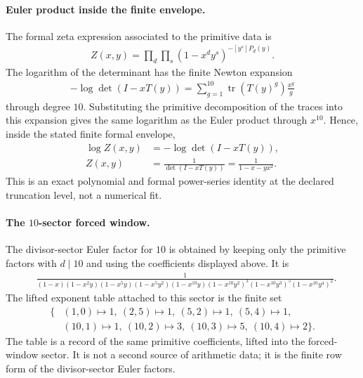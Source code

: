 \paragraph{Euler product inside the finite envelope.}
The formal zeta expression associated to the primitive data is
$$
\begin{aligned}
Z(x,y)=\prod_d\prod_s\left(1-x^d y^s\right)^{-[y^s]P_d(y)}.
\end{aligned}
$$
The logarithm of the determinant has the finite Newton expansion
$$
\begin{aligned}
-\log\det(I-xT(y))=\sum_{g=1}^{10}\operatorname{tr}(T(y)^g)\frac{x^g}{g}
\end{aligned}
$$
through degree $10$. Substituting the primitive decomposition of the traces into this expansion gives the same logarithm as the Euler product through $x^{10}$. Hence, inside the stated finite formal envelope,
$$
\begin{aligned}
\log Z(x,y)&=-\log\det(I-xT(y)),\\
Z(x,y)&=\frac{1}{\det(I-xT(y))}=\frac{1}{1-x-yx^2}.
\end{aligned}
$$
This is an exact polynomial and formal power-series identity at the declared truncation level, not a numerical fit.

\paragraph{The $10$-sector forced window.}
The divisor-sector Euler factor for $10$ is obtained by keeping only the primitive factors with $d\mid 10$ and using the coefficients displayed above. It is
$$
\begin{aligned}
&\frac{1}{(1-x)(1-x^2y)(1-x^5y)(1-x^5y^2)(1-x^{10}y)(1-x^{10}y^2)^3(1-x^{10}y^3)^5(1-x^{10}y^4)^2}.
\end{aligned}
$$
The lifted exponent table attached to this sector is the finite set
$$
\begin{aligned}
\{&(1,0)\mapsto 1,\ (2,5)\mapsto 1,\ (5,2)\mapsto 1,\ (5,4)\mapsto 1,\\
&(10,1)\mapsto 1,\ (10,2)\mapsto 3,\ (10,3)\mapsto 5,\ (10,4)\mapsto 2\}.
\end{aligned}
$$
The table is a record of the same primitive coefficients, lifted into the forced-window sector. It is not a second source of arithmetic data; it is the finite row form of the divisor-sector Euler factors.


